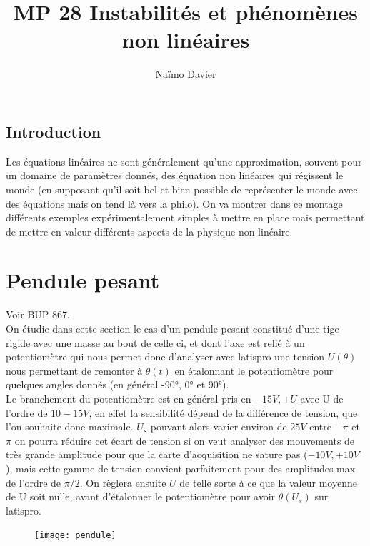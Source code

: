 \documentclass[12pt,prb,aps,epsf]{article}
\begin{document}
	
	\title{MP 28 Instabilités et phénomènes non linéaires}
	\author{Naïmo Davier}
	
	\maketitle
	
	\tableofcontents
	
	\pagebreak
	
\subsection{Introduction}	
Les équations linéaires ne sont généralement qu'une approximation, souvent pour un domaine de paramètres donnés, des équation non linéaires qui régissent le monde (en supposant qu'il soit bel et bien possible de représenter le monde avec des équations mais on tend là vers la philo). On va montrer dans ce montage différents exemples expérimentalement simples à mettre en place mais permettant de mettre en valeur différents aspects de la physique non linéaire.


\section{Pendule pesant}
Voir BUP 867.\\

On étudie dans cette section le cas d'un pendule pesant constitué d'une tige rigide avec une masse au bout de celle ci, et dont l'axe est relié à un potentiomètre qui nous permet donc d'analyser avec latispro une tension $U(\theta)$ nous permettant de remonter à $\theta(t)$ en étalonnant le potentiomètre pour quelques angles donnés (en général -90°, 0° et 90°).\\

Le branchement du potentiomètre est en général pris en $-15V, +U$ avec U de l'ordre de $10-15V$, en effet la sensibilité dépend de la différence de tension, que l'on souhaite donc maximale. $U_s$ pouvant alors varier environ de $25V$ entre $-\pi$ et $\pi$ on pourra réduire cet écart de tension si on veut analyser des mouvements de très grande amplitude pour que la carte d'acquisition ne sature pas ($-10V,+10V$), mais cette gamme de tension convient parfaitement pour des amplitudes max de l'ordre de $\pi/2$. On règlera ensuite $U$ de telle sorte à ce que la valeur moyenne de U soit nulle, avant d'étalonner le potentiomètre pour avoir $\theta(U_s)$ sur latispro.

\begin{figure}[h]
	\centerline{\texttt{[image: pendule]}}
\end{figure}
\end{document}
